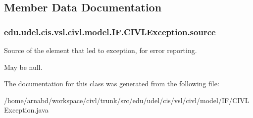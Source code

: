 \subsection{Member Data Documentation}
\hypertarget{classedu_1_1udel_1_1cis_1_1vsl_1_1civl_1_1model_1_1IF_1_1CIVLException_a29eba9d3541bcd7e2306404c6ece4d98}{}
\subsubsection[{source}]{ edu.\+udel.\+cis.\+vsl.\+civl.\+model.\+I\+F.\+C\+I\+V\+L\+Exception.\+source\hspace{0.3cm}{\ttfamily [protected]}}\label{classedu_1_1udel_1_1cis_1_1vsl_1_1civl_1_1model_1_1IF_1_1CIVLException_a29eba9d3541bcd7e2306404c6ece4d98}


Source of the element that led to exception, for error reporting. 

May be null. 

The documentation for this class was generated from the following file\+:\begin{DoxyCompactItemize}
\item 
/home/arnabd/workspace/civl/trunk/src/edu/udel/cis/vsl/civl/model/\+I\+F/C\+I\+V\+L\+Exception.\+java\end{DoxyCompactItemize}
